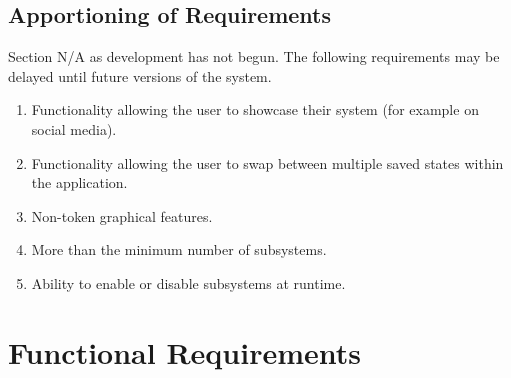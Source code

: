 \documentclass[]{article}
\begin{document}
\subsection{Apportioning of Requirements}
\label{sub:apportioning_of_requirements}
	Section N/A as development has not begun.
	The following requirements may be delayed until future versions of the system.
	\begin{enumerate}
		\item Functionality allowing the user to showcase their system (for example on social media).
		\item Functionality allowing the user to swap between multiple saved states within the application.
		\item Non-token graphical features.
		\item More than the minimum number of subsystems.
		\item Ability to enable or disable subsystems at runtime.
	\end{enumerate}

\section{Functional Requirements}
\label{sec:functional_requirements}
\end{document}
